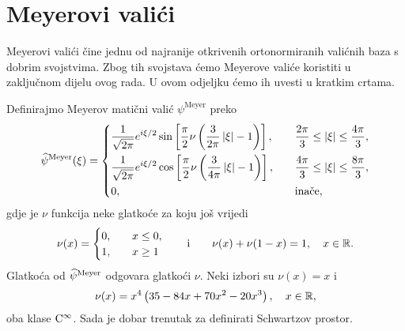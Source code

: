 \documentclass[main.tex]{subfiles}
\begin{document}
\section{Meyerovi valići}\label{sec:meyer}
Meyerovi valići čine jednu od najranije otkrivenih
ortonormiranih valićnih baza s dobrim svojstvima.
Zbog tih svojstava ćemo Meyerove valiće koristiti u zaključnom dijelu ovog rada.
U ovom odjeljku ćemo ih uvesti u kratkim crtama.

\newcommand{\psm}{\psi^{\mathrm{Meyer}}}
\newcommand{\whpsm}{\wh\psi^{\mathrm{Meyer}}}
Definirajmo Meyerov matični valić \( \psm \) preko
\begin{equation}\label{eq:meyer}
	\whpsm(\xi) = \begin{dcases}
		\frac 1{\sqrt{2\pi}}e^{i\xi/2}\sin\left[ \frac \pi2 \nu \left( \frac 3{2\pi} \abs \xi - 1 \right) \right],
		                                                                                                           & \quad \frac {2\pi}3 \le \abs \xi \le \frac {4\pi}3,                                                                   \\
		\frac 1{\sqrt{2\pi}}e^{i\xi/2}\cos\left[ \frac \pi2 \nu \left( \frac 3{4\pi} \abs \xi - 1 \right) \right], &
		\quad \frac {4\pi}3 \le \abs \xi \le \frac {8\pi}3,                                                                                                                                                                                \\
		0,                                                                                                         & \quad                                                                                                   \text{inače},
	\end{dcases}
\end{equation}
gdje je \( \nu \) funkcija neke glatkoće za koju još vrijedi
\begin{equation}
	\nu(x) = \begin{cases}
		0, \quad & x \le 0, \\
		1, \quad & x \ge 1
	\end{cases}
	\qquad \text i \qquad
	\nu(x) + \nu(1-x) = 1, \quad x \in \mathbb{R}.
\end{equation}
Glatkoća od \( \whpsm \) odgovara glatkoći \( \nu \). Neki izbori su \( \nu(x) = x \)
i
\begin{equation}
	\nu(x) = x^4\left( 35-84x+70x^2-20x^3 \right), \quad x \in \mathbb{R},
\end{equation}
oba klase \( \mathrm{C}^\infty \). Sada je dobar trenutak za definirati Schwartzov prostor.
\end{document}
